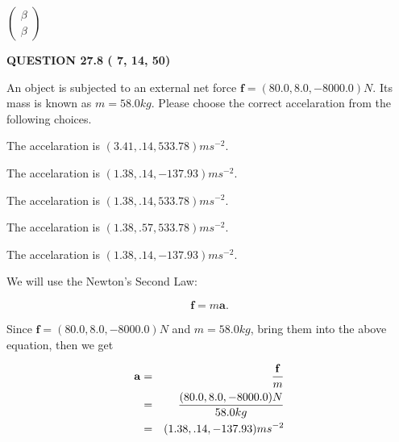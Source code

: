 \documentclass[12pt]{article}
\begin{document}
   
 $  \left( \begin{array}
 {
 c
 }
 \beta \\ 
 \beta
 \end{array} \right) $ 
  
\vspace{0.2in}
  
{\textbf{\Large{QUESTION
27.8 
 (          7,         14,         50)
}}}
  
  
 
An object is subjected to an external net force $\mathbf{f}=
(80.0 , 8.0 , -8000.0) N$.
Its mass is known as $m= %
58.0 kg$.
Please choose the correct accelaration from the following choices.
 
 
  The accelaration is $  %
(
3.41,
.14,
533.78)
ms^{-2} $.
 
 
  The accelaration is $  %
(
1.38,
.14,
-137.93)
ms^{-2} $.
 
 
  The accelaration is $  %
(
1.38,
.14,
533.78)
ms^{-2} $.
 
 
  The accelaration is $  %
(
1.38,
.57,
533.78)
ms^{-2} $.
 
 
\noindent{}
 
 
  The accelaration is $  %
(
1.38,
.14,
-137.93)
ms^{-2} $.
 
 
\noindent{}
 
 
 
 
 
\noindent{}
 
 

We will use the Newton's Second Law:
 
\[
\mathbf{f}=m\mathbf{a}.
\]
 
Since $\mathbf{f}= %
(80.0 , 8.0 , -8000.0) N$
and $m= %
58.0kg$, bring them into the above equation, then we get
 
\begin{eqnarray*}
\mathbf{a}&=&\frac{\mathbf{f}}m  \\
&=&\frac{ %
(80.0 , 8.0 , -8000.0) N}{ %
58.0kg}  \\
&=& %
(1.38 , .14 , -137.93) ms^{-2}
\end{eqnarray*}
 
\end{document}
